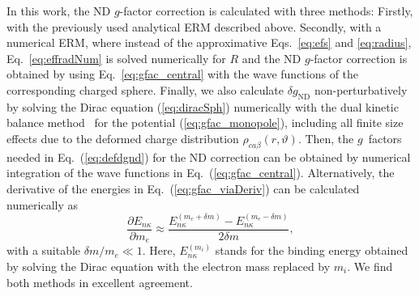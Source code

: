 In this work, the ND $g$-factor correction is calculated with three methods:
Firstly, with the previously used analytical ERM described above. Secondly, with a numerical ERM, where instead of the approximative Eqs.~\eqref{eq:efs} and \eqref{eq:radius}, Eq.~\eqref{eq:effradNum} is solved numerically for $R$ and the ND $g$-factor correction is obtained by using Eq.~\eqref{eq:gfac_central} with the wave functions of the corresponding charged sphere.
Finally, we also calculate $\delta g_{\text{ND}}$ non-perturbatively by solving the Dirac equation (\ref{eq:diracSph}) numerically with the dual kinetic balance method~\cite{dualkinetic} for the potential (\ref{eq:gfac_monopole}), including all finite size effects due to the deformed charge distribution $\rho_{ca\beta}(r,\vartheta)$. Then, the $g$~factors needed in Eq.~(\ref{eq:defdgnd}) for the ND correction can be obtained by numerical integration of the wave functions in Eq.~(\ref{eq:gfac_central}). Alternatively, the derivative of the energies in Eq.~(\ref{eq:gfac_viaDeriv}) can be calculated numerically as 
\begin{equation}
\frac{\partial E_{n\kappa}}{\partial m_e} \approx \frac{E_{n\kappa}^{(m_e+\delta m)}-E_{n\kappa}^{(m_e-\delta m)}}{2 \delta m},
\end{equation}
with a suitable ${\delta m / m_e}{\ll}{1}$. Here, $E_{n\kappa}^{(m_i)}$ stands for the binding energy obtained by solving the Dirac equation with the electron mass replaced by $m_i$. We find both methods in excellent agreement.

